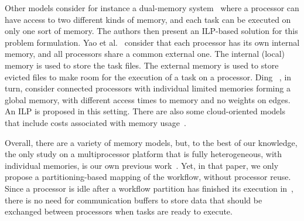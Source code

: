 \documentclass[conference]{IEEEtran}
\newcommand{\new}[1]{{\color{blue}#1}}
\begin{document}
Other models consider for instance a 
dual-memory system~\cite{herrmann2014memory} where a processor can have access 
to two different kinds of memory, and each task can be executed on only one sort of memory.
The authors then present an ILP-based solution for this problem formulation.
%
Yao et al.~\cite{yao2022memory} consider that each processor has its own internal memory, and all
processors share a common external one. The internal (local) memory is used to store the task files.
The external memory is used to store evicted files to make room for the execution of a task on a processor.
%
Ding \etal~\cite{ding2024ils}, in turn, consider connected processors with individual limited memories
forming a global memory, with different access times to memory and no weights on edges. An ILP
is proposed in this setting. 
%
%
There are also some cloud-oriented models that include costs associated with memory usage~\cite{liang2020memory}.

Overall, there are a variety of memory models, but, to the best of our knowledge, the only study on a multiprocessor
platform that is fully heterogeneous, with individual memories, \new{is our own previous work~\cite{DBLP:conf/icpp/KulaginaMB24}.}
\new{Yet, in that paper, we only propose} a partitioning-based mapping of the workflow, without processor reuse.
\new{Since a processor is idle after a workflow partition has finished its execution 
in~\cite{DBLP:conf/icpp/KulaginaMB24},
there is no need for communication buffers to store data
that should be \new{exchanged} between processors when tasks are ready to execute.}
\end{document}
